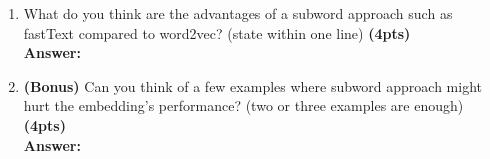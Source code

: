 \documentclass{assignment format}
\newenvironment{answer}{
    {\bf Answer:} \begingroup\color{red}
}{\endgroup}%
\begin{document}
\begin{enumerate}[label=(\alph*)]
    \begin{answer}

    \end{answer}
    \item What do you think are the advantages of a subword approach such as fastText compared to word2vec? (state within one line) \textbf{(4pts)}\\
    \begin{answer}

    \end{answer}
\item \textbf{(Bonus)} Can you think of a few examples where subword approach might hurt the embedding’s performance? (two or three examples are enough) \textbf{(4pts)}\\
    \begin{answer}

    \end{answer}
\end{enumerate}
\end{document}
